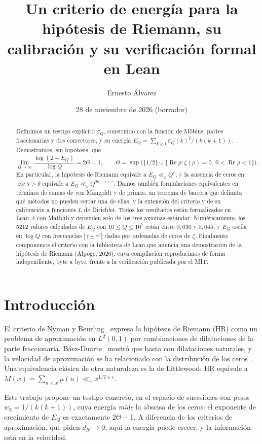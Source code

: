 \documentclass[11pt,a4paper]{amsart}
\title[Un criterio de energ\'ia para la hip\'otesis de Riemann]{Un criterio de energ\'ia para la hip\'otesis de Riemann, su calibraci\'on y su verificaci\'on formal en Lean}
\author{Ernesto \'Alvarez}
\date{28 de noviembre de 2026 (borrador)}
\theoremstyle{definition}
\theoremstyle{remark}
\renewcommand{\Re}{\operatorname{Re}}
\begin{document}
\begin{abstract}
Definimos un testigo expl\'icito $\sigma_Q$, construido con la funci\'on de M\"obius, partes fraccionarias y dos correctores, y su energ\'ia $E_Q=\sum_{k\ge1}\sigma_Q(k)^2/(k(k+1))$. Demostramos, sin hip\'otesis, que
\[
  \lim_{Q\to\infty}\frac{\log(2+E_Q)}{\log Q}=2\Theta-1,
  \qquad \Theta=\sup\bigl(\{1/2\}\cup\{\Re\rho:\zeta(\rho)=0,\ 0<\Re\rho<1\}\bigr).
\]
En particular, la hip\'otesis de Riemann equivale a $E_Q\ll_\varepsilon Q^\varepsilon$, y la ausencia de ceros en $\Re s>\theta$ equivale a $E_Q\ll_\varepsilon Q^{2\theta-1+\varepsilon}$. Damos tambi\'en formulaciones equivalentes en t\'erminos de sumas de von Mangoldt y de primos, un teorema de barrera que delimita qu\'e m\'etodos no pueden cerrar una de ellas, y la extensi\'on del criterio y de su calibraci\'on a funciones $L$ de Dirichlet. Todos los resultados est\'an formalizados en Lean~4 con Mathlib y dependen solo de los tres axiomas est\'andar. Num\'ericamente, los 5212 valores calculados de $E_Q$ con $10\le Q\le10^7$ est\'an entre $0{,}030$ y $0{,}045$, y $E_Q$ oscila en $\log Q$ con frecuencias $|\gamma\pm\gamma'|$ dadas por ordenadas de ceros de $\zeta$. Finalmente componemos el criterio con la biblioteca de Lean que anuncia una demostraci\'on de la hip\'otesis de Riemann (Alp\"oge, 2026), cuya compilaci\'on reproducimos de forma independiente, byte a byte, frente a la verificaci\'on publicada por el MIT.
\end{abstract}

\maketitle

\section{Introducci\'on}

El criterio de Nyman y Beurling~\cite{Nyman,Beurling} expresa la hip\'otesis de Riemann (HR) como un problema de aproximaci\'on en $L^2(0,1)$ por combinaciones de dilataciones de la parte fraccionaria. B\'aez-Duarte~\cite{BaezDuarte} mostr\'o que basta con dilataciones naturales, y la velocidad de aproximaci\'on se ha relacionado con la distribuci\'on de los ceros~\cite{BalazardSaias,Burnol,BCF}. Una equivalencia cl\'asica de otra naturaleza es la de Littlewood: HR equivale a $M(x)=\sum_{n\le x}\mu(n)\ll_\varepsilon x^{1/2+\varepsilon}$.

Este trabajo propone un testigo concreto, en el espacio de sucesiones con pesos $w_k=1/(k(k+1))$, cuya energ\'ia \emph{mide} la abscisa de los ceros: el exponente de crecimiento de $E_Q$ es exactamente $2\Theta-1$. A diferencia de los criterios de aproximaci\'on, que piden $d_N\to0$, aqu\'i la energ\'ia puede crecer, y la informaci\'on est\'a en la velocidad.
\end{document}
